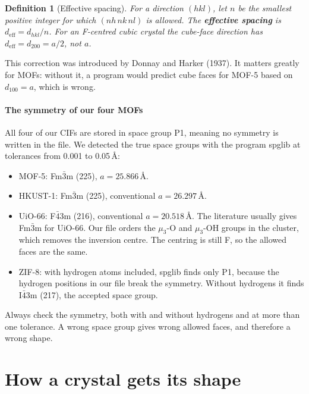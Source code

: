 \documentclass[11pt,a4paper]{article}
\newtheorem{definition}{Definition}
\theoremstyle{remark}\newtheorem*{example}{Worked example}
\begin{document}
\begin{definition}[Effective spacing]
For a direction $(hkl)$, let $n$ be the smallest positive integer for which $(nh\,nk\,nl)$ is allowed. The \textbf{effective spacing} is $d_{\text{eff}}=d_{hkl}/n$. For an F-centred cubic crystal the cube-face direction has $d_{\text{eff}}=d_{200}=a/2$, not $a$.
\end{definition}

This correction was introduced by Donnay and Harker (1937). It matters greatly for MOFs: without it, a program would predict cube faces for MOF-5 based on $d_{100}=a$, which is wrong.

\subsection{The symmetry of our four MOFs}\label{sec:ourmofs}
All four of our CIFs are stored in space group P1, meaning no symmetry is written in the file. We detected the true space groups with the program spglib at tolerances from 0.001 to 0.05\,\AA:
\begin{itemize}
\item MOF-5: Fm$\bar3$m (225), $a=25.866$\,\AA.
\item HKUST-1: Fm$\bar3$m (225), conventional $a=26.297$\,\AA.
\item UiO-66: F$\bar4$3m (216), conventional $a=20.518$\,\AA. The literature usually gives Fm$\bar3$m for UiO-66. Our file orders the $\mu_3$-O and $\mu_3$-OH groups in the cluster, which removes the inversion centre. The centring is still F, so the allowed faces are the same.
\item ZIF-8: with hydrogen atoms included, spglib finds only P1, because the hydrogen positions in our file break the symmetry. Without hydrogens it finds I$\bar4$3m (217), the accepted space group.
\end{itemize}

\begin{careful}
Always check the symmetry, both with and without hydrogens and at more than one tolerance. A wrong space group gives wrong allowed faces, and therefore a wrong shape.
\end{careful}

\part{How a crystal gets its shape}
\end{document}
